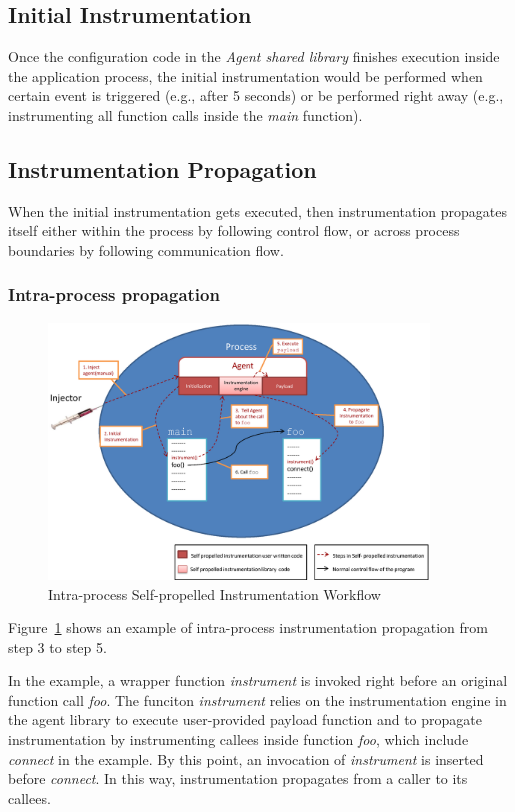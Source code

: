\subsection{Initial Instrumentation}
Once the configuration code in the {\em Agent shared library} finishes execution
inside the application process, the initial instrumentation would be performed
when certain event is triggered (e.g., after 5 seconds) or be performed right
away (e.g., instrumenting all function calls inside the {\em main} function).

\subsection{Instrumentation Propagation}
When the initial instrumentation gets executed, then instrumentation propagates
itself either within the process by following control flow, or across process
boundaries by following communication flow.

\subsubsection{Intra-process propagation}
\begin{figure}[ht]
  \centering
  \includegraphics[width=0.90\textwidth]{figure/intraprocess.eps}
  \caption{Intra-process Self-propelled Instrumentation Workflow}
   \label{fig:intrainst}
\end{figure}


Figure~\ref{fig:intrainst} shows an example of intra-process instrumentation
propagation from step 3 to step 5.

In the example, a wrapper function {\em instrument} is invoked right before an
original function call {\em foo}.  The funciton {\em instrument} relies on the
instrumentation engine in the agent library to execute user-provided payload
function and to propagate instrumentation by instrumenting callees inside
function {\em foo}, which include {\em connect} in the example. By this point,
an invocation of {\em instrument} is inserted before {\em connect}. In this way,
instrumentation propagates from a caller to its callees.

